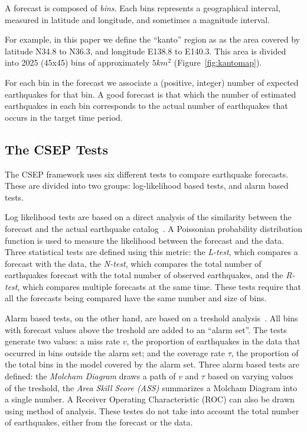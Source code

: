 \documentclass{sig-alternate}
\begin{document}
A forecast is composed of \emph{bins}. Each bins represents a
geographical interval, measured in latitude and longitude, and
sometimes a magnitude interval. 

For example, in this paper we define the ``kanto'' region as as the
area covered by latitude N34.8 to N36.3, and longitude E138.8 to
E140.3. This area is divided into 2025 (45x45) bins of approximately
$5km^2$ (Figure~\ref{fig:kantomap}).

For each bin in the forecast we associate a (positive, integer) number
of expected earthquakes for that bin. A good forecast is that which
the number of estimated earthquakes in each bin corresponds to the
actual number of earthquakes that occurs in the target time period.

\subsection{The CSEP Tests} 

The CSEP framework uses six different tests to compare earthquake
forecasts. These are divided into two groups: log-likelihood based
tests, and alarm based tests.

Log likelihood tests are based on a direct analysis of the similarity
between the forecast and the actual earthquake
catalog~\cite{Schorlemmer2007}. A Poissonian probability distribution
function is used to measure the likelihood between the forecast and
the data. Three statistical tests are defined using this metric: the
\emph{L-test}, which compares a forecast with the data, the
\emph{N-test}, which compares the total number of earthquakes forecast
with the total number of observed earthquakes, and the \emph{R-test},
which compares multiple forecasts at the same time. These tests
require that all the forecasts being compared have the same number and
size of bins.

Alarm based tests, on the other hand, are based on a treshold
analysis~\cite{Zechar2010}. All bins with forecast values above the
treshold are added to an ``alarm set''. The tests generate two values:
a miss rate $v$, the proportion of earthquakes in the data that
occurred in bins outside the alarm set; and the coverage rate $\tau$,
the proportion of the total bins in the model covered by the alarm
set. Three alarm based tests are defined: the \emph{Molcham Diagram}
draws a path of $v$ and $\tau$ based on varying values of the
treshold, the \emph{Area Skill Score (ASS)} summarizes a Molcham
Diagram into a single number. A Receiver Operating Characteristic
(ROC) can also be drawn using method of analysis. These testes do not
take into account the total number of earthquakes, either from the
forecast or the data.
\end{document}

